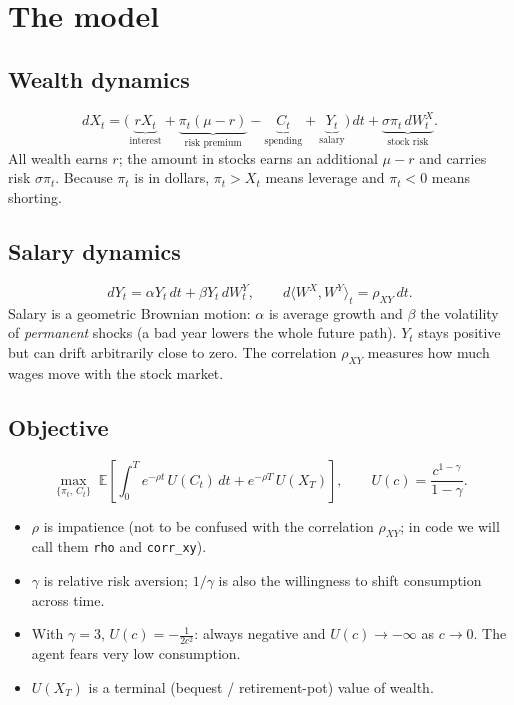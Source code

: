 \documentclass[11pt]{article}
\newcommand{\E}{\mathbb{E}}
\newcommand{\rxy}{\rho_{XY}}
\begin{document}
\section{The model}

\subsection{Wealth dynamics}
\begin{equation}\label{eq:wealth}
dX_t = \big(\underbrace{rX_t}_{\text{interest}}
      + \underbrace{\pi_t(\mu-r)}_{\text{risk premium}}
      - \underbrace{C_t}_{\text{spending}}
      + \underbrace{Y_t}_{\text{salary}}\big)\,dt
      + \underbrace{\sigma\pi_t\,dW^X_t}_{\text{stock risk}} .
\end{equation}
All wealth earns $r$; the amount in stocks earns an additional $\mu-r$ and carries
risk $\sigma\pi_t$. Because $\pi_t$ is in dollars, $\pi_t > X_t$ means leverage and
$\pi_t<0$ means shorting.

\subsection{Salary dynamics}
\begin{equation}\label{eq:income}
dY_t = \alpha Y_t\,dt + \beta Y_t\,dW^Y_t,
\qquad d\langle W^X, W^Y\rangle_t = \rxy\,dt .
\end{equation}
Salary is a geometric Brownian motion: $\alpha$ is average growth and $\beta$ the
volatility of \emph{permanent} shocks (a bad year lowers the whole future path).
$Y_t$ stays positive but can drift arbitrarily close to zero. The correlation
$\rxy$ measures how much wages move with the stock market.

\subsection{Objective}
\begin{equation}\label{eq:objective}
\max_{\{\pi_t,\,C_t\}}\;
\E\!\left[\int_0^T e^{-\rho t}\,U(C_t)\,dt + e^{-\rho T}\,U(X_T)\right],
\qquad U(c) = \frac{c^{1-\gamma}}{1-\gamma}.
\end{equation}
\begin{itemize}
  \item $\rho$ is impatience (not to be confused with the correlation $\rxy$;
        in code we will call them \texttt{rho} and \texttt{corr\_xy}).
  \item $\gamma$ is relative risk aversion; $1/\gamma$ is also the willingness to
        shift consumption across time.
  \item With $\gamma=3$, $U(c) = -\tfrac{1}{2c^2}$: always negative and
        $U(c)\to-\infty$ as $c\to0$. The agent fears very low consumption.
  \item $U(X_T)$ is a terminal (bequest / retirement-pot) value of wealth.
\end{itemize}
\end{document}
